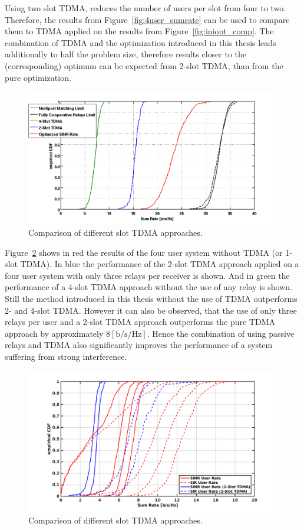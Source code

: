 Using two slot TDMA, reduces the number of users per slot from four to two.
Therefore, the results from Figure~\ref{fig:4user_sumrate} can be used to compare them to TDMA applied on the results from Figure~\ref{fig:iniopt_comp}.
The combination of TDMA and the optimization introduced in this thesis leads additionally to half the problem size, therefore results closer to the (corresponding) optimum can be expected from 2-slot TDMA, than from the pure optimization.
\begin{figure}[h]
\centering
  \includegraphics[width=\linewidth]{images/SlotTDMAcomparison_edited.png}
\caption{Comparison of different slot TDMA approaches.}
\label{fig:tdma_comb}
\end{figure}

Figure~\ref{fig:tdma_comb} shows in red the results of the four user system without TDMA (or 1-slot TDMA).
In blue the performance of the 2-slot TDMA approach applied on a four user system with only three relays per receiver is shown.
And in green the performance of a 4-slot TDMA approach without the use of any relay is shown.
Still the method introduced in this thesis without the use of TDMA outperforms 2- and 4-slot TDMA.
However it can also be observed, that the use of only three relays per user and a 2-slot TDMA approach outperforms the pure TDMA approach by approximately $8 \left[\text{b/s/Hz}\right]$.
Hence the combination of using passive relays and TDMA also significantly improves the performance of a system suffering from strong interference.

\begin{figure}[h]
\centering
  \includegraphics[width=\linewidth]{images/SlotTDMAcomparison_user.png}
\caption{Comparison of different slot TDMA approaches.}
\label{fig:tdma_comb}
\end{figure}






